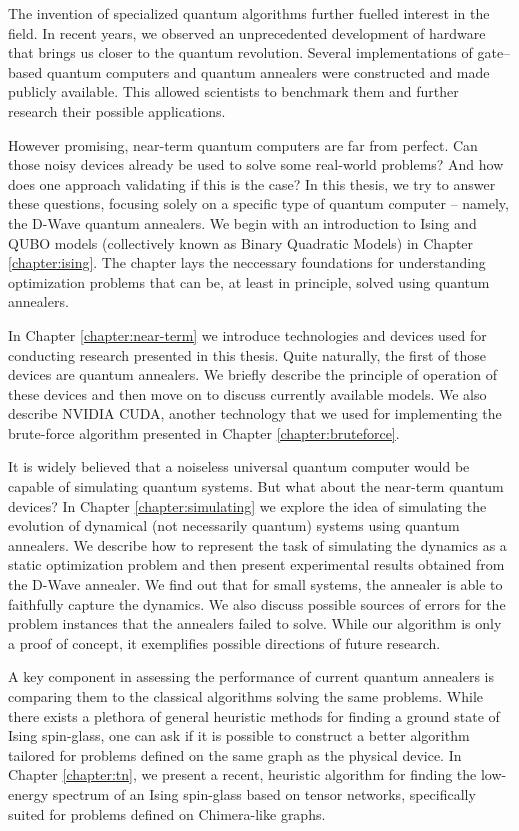 The invention of specialized quantum algorithms further fuelled interest in the
field. In recent years, we observed an unprecedented development of hardware
that brings us closer to the quantum revolution. Several implementations of
gate--based quantum computers \cite{ionq, bohnet} and quantum annealers
\cite{johnson, dattani} were constructed and made publicly available. This
allowed scientists to benchmark them and further research their possible
applications.

However promising, near-term quantum computers are far from perfect. Can those
noisy devices already be used to solve some real-world problems? And how does
one approach validating if this is the case? In this thesis, we try to answer
these questions, focusing solely on a specific type of quantum computer --
namely, the D-Wave quantum annealers. We begin with an introduction to Ising
and QUBO models (collectively known as Binary Quadratic Models) in Chapter
\ref{chapter:ising}. The chapter lays the neccessary foundations for
understanding optimization problems that can be, at least in principle, solved
using quantum annealers.

In Chapter \ref{chapter:near-term} we introduce technologies and devices used
for conducting research presented in this thesis. Quite naturally, the first of
those devices are quantum annealers. We briefly describe the principle of
operation of these devices and then move on to discuss currently available
models. We also describe NVIDIA CUDA, another technology that we used for
implementing the brute-force algorithm presented in Chapter
\ref{chapter:bruteforce}.

It is widely believed that a noiseless universal quantum computer would be
capable of simulating quantum systems. But what about the near-term quantum
devices? In Chapter \ref{chapter:simulating} we explore the idea of simulating
the evolution of dynamical (not necessarily quantum) systems using quantum
annealers. We describe how to represent the task of simulating the dynamics as
a static optimization problem and then present experimental results obtained
from the D-Wave annealer. We find out that for small systems, the annealer is
able to faithfully capture the dynamics. We also discuss possible sources of
errors for the problem instances that the annealers failed to solve. While our
algorithm is only a proof of concept, it exemplifies possible directions of
future research.

A key component in assessing the performance of current quantum annealers is
comparing them to the classical algorithms solving the same problems. While
there exists a plethora of general heuristic methods for finding a ground state
of Ising spin-glass, one can ask if it is possible to construct a better
algorithm tailored for problems defined on the same graph as the physical
device. In Chapter \ref{chapter:tn}, we present a recent, heuristic algorithm
for finding the low-energy spectrum of an Ising spin-glass based on tensor
networks, specifically suited for problems defined on Chimera-like graphs.

